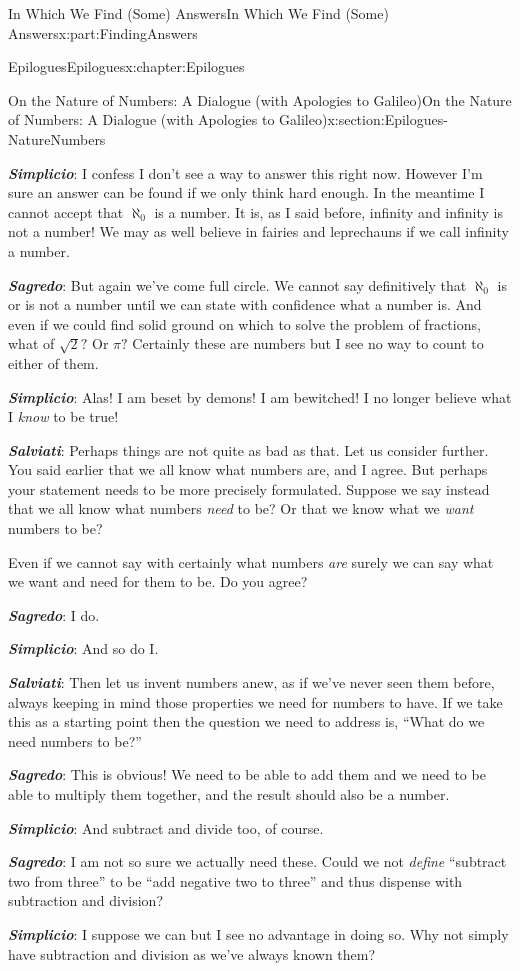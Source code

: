 \documentclass[oneside,10pt,]{book}
\newcommand{\alert}[1]{\textbf{\textit{#1}}}
\numberwithin{equation}{section}
\begin{document}
\begin{partptx}{In Which We Find (Some) Answers}{}{In Which We Find (Some) Answers}{}{}{x:part:FindingAnswers}
\begin{chapterptx}{Epilogues}{}{Epilogues}{}{}{x:chapter:Epilogues}
\begin{sectionptx}{On the Nature of Numbers: A Dialogue (with Apologies to Galileo)}{}{On the Nature of Numbers: A Dialogue (with Apologies to Galileo)}{}{}{x:section:Epilogues-NatureNumbers}
\begin{introduction}{}
\par
\alert{Simplicio}:  I confess I don't see a way to answer this right now. However I'm sure an answer can be found if we only think hard enough. In the meantime I cannot accept that \(\aleph_0\) is a number. It is, as I said before, infinity and infinity is not a number! We may as well believe in fairies and leprechauns if we call infinity a number.%
\par
\alert{Sagredo}:  But again we've come full circle. We cannot say definitively that \(\aleph_0\) is or is not a number until we can state with confidence what a number is. And even if we could find solid ground on which to solve the problem of fractions, what of \(\sqrt{2}?\) Or \(\pi?\) Certainly these are numbers but I see no way to count to either of them.%
\par
\alert{Simplicio}:  Alas! I am beset by demons! I am bewitched! I no longer believe what I \emph{know} to be true!%
\par
\alert{Salviati}:  Perhaps things are not quite as bad as that. Let us consider further. You said earlier that we all know what numbers are, and I agree. But perhaps your statement needs to be more precisely formulated. Suppose we say instead that we all know what numbers \emph{need} to be? Or that we know what we \emph{want} numbers to be?%
\par
Even if we cannot say with certainly what numbers \emph{are} surely we can say what we want and need for them to be. Do you agree?%
\par
\alert{Sagredo}:  I do.%
\par
\alert{Simplicio}:  And so do I.%
\par
\alert{Salviati}:  Then let us invent numbers anew, as if we've never seen them before, always keeping in mind those properties we need for numbers to have. If we take this as a starting point then the question we need to address is, ``What do we need numbers to be?''%
\par
\alert{Sagredo}:  This is obvious! We need to be able to add them and we need to be able to multiply them together, and the result should also be a number.%
\par
\alert{Simplicio}:  And subtract and divide too, of course.%
\par
\alert{Sagredo}:  I am not so sure we actually need these. Could we not \emph{define} ``subtract two from three'' to be ``add negative two to three'' and thus dispense with subtraction and division?%
\par
\alert{Simplicio}:  I suppose we can but I see no advantage in doing so. Why not simply have subtraction and division as we've always known them?%

\end{introduction}
\end{sectionptx}
\end{chapterptx}
\end{partptx}
\end{document}

